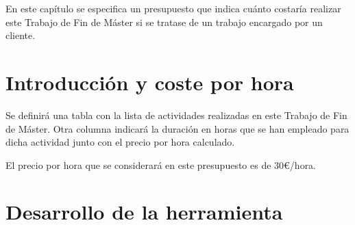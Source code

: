 

En este capítulo se especifica un presupuesto que indica cuánto costaría realizar este Trabajo de Fin de Máster
si se tratase de un trabajo encargado por un cliente.

\section{Introducción y coste por hora}
\label{6:sec:1}

Se definirá una tabla con la lista de actividades realizadas en este Trabajo de Fin de Máster. Otra columna indicará la duración en horas que se han empleado para dicha actividad junto con el precio por hora calculado.
\bigskip

El precio por hora que se considerará en este presupuesto es de 30\euro{}/hora.
\newpage
    
\section{Desarrollo de la herramienta}
\label{6:sec:2}




